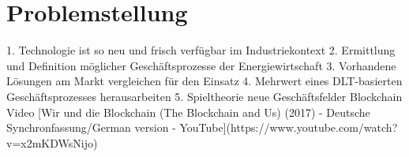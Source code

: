 \section{Problemstellung}
1. Technologie ist so neu und frisch verfügbar im Industriekontext
2. Ermittlung und Definition möglicher Geschäftsprozesse der Energiewirtschaft
3. Vorhandene Lösungen am Markt vergleichen für den Einsatz
4. Mehrwert eines DLT-basierten Geschäftsprozesses herausarbeiten
5. Spieltheorie neue Geschäftsfelder Blockchain Video [Wir und die Blockchain (The Blockchain and Us) (2017) - Deutsche Synchronfassung/German version - YouTube](https://www.youtube.com/watch?v=x2mKDWsNijo)

\newpage